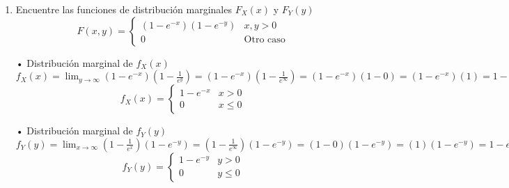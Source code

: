 \documentclass[a4paper, 12pt]{article}
\newcommand{\Aspace}{0.2cm}
\begin{document}
\begin{enumerate}
        \item Encuentre las funciones de distribución marginales $F_{X}(x)$ y $F_{Y}(y)$
        \[
            F(x, y) =
            \begin{cases}
                (1 - e^{-x})(1 - e^{-y})    &   x, y > 0    \\
                0                           &   \text{Otro caso}
            \end{cases}
        \]
            \vspace{\Aspace}
            { \color{azul} 
                \par • Distribución marginal de $f_{X}(x)$ \\
                \(
                    f_{X}(x)
                    = \lim_{y \rightarrow \infty} (1 - e^{-x})(1 - \frac{1}{e^{y}})
                    = (1 - e^{-x})(1 - \frac{1}{e^{\infty}})
                    = (1 - e^{-x})(1 - 0)
                    = (1 - e^{-x})(1)
                    = 1 - e^{-x}
                \)
                \[
                    f_{X}(x) =
                    \begin{cases}
                        1 - e^{-x}  &   x > 0       \\
                        0           &   x \leq 0
                    \end{cases}
                \]

                \par • Distribución marginal de $f_{Y}(y)$ \\
                \(
                    f_{Y}(y)
                    = \lim_{x \rightarrow \infty} (1 - \frac{1}{e^{x}})(1 - e^{-y})
                    = (1 - \frac{1}{e^{\infty}})(1 - e^{-y})
                    = (1 - 0)(1 - e^{-y})
                    = (1)(1 - e^{-y})
                    = 1 - e^{-y}                   
                \)
                \[
                    f_{Y}(y) =
                    \begin{cases}
                        1 - e^{-y}  &   y > 0       \\
                        0           &   y \leq 0
                    \end{cases}
                \]
            }
    \end{enumerate}



    \newpage
    \vspace{0.3cm}
\end{document}
